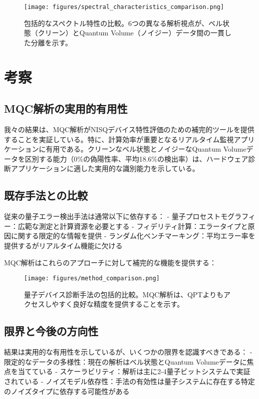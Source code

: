 \documentclass[a4paper,11pt]{article}
\begin{document}
\begin{CJK}{UTF8}{min}
\begin{figure}[H]
\centering
\texttt{[image: figures/spectral\_characteristics\_comparison.png]}
\caption{包括的なスペクトル特性の比較。6つの異なる解析視点が、ベル状態（クリーン）とQuantum Volume（ノイジー）データ間の一貫した分離を示す。}
\label{fig:spectral_comparison}
\end{figure}

\section{考察}

\subsection{MQC解析の実用的有用性}

我々の結果は、MQC解析がNISQデバイス特性評価のための補完的ツールを提供することを実証している。特に、計算効率が重要となるリアルタイム監視アプリケーションに有用である。クリーンなベル状態とノイジーなQuantum Volumeデータを区別する能力（0\%の偽陽性率、平均18.6\%の検出率）は、ハードウェア診断アプリケーションに適した実用的な識別能力を示している。

\subsection{既存手法との比較}

従来の量子エラー検出手法は通常以下に依存する：
- 量子プロセストモグラフィー：広範な測定と計算資源を必要とする
- フィデリティ計算：エラータイプと原因に関する限定的な情報を提供
- ランダム化ベンチマーキング：平均エラー率を提供するがリアルタイム機能に欠ける

MQC解析はこれらのアプローチに対して補完的な機能を提供する：

\begin{figure}[H]
\centering
\texttt{[image: figures/method\_comparison.png]}
\caption{量子デバイス診断手法の包括的比較。MQC解析は、QPTよりもアクセスしやすく良好な精度を提供することを示す。}
\label{fig:method_comparison}
\end{figure}

\subsection{限界と今後の方向性}

結果は実用的な有用性を示しているが、いくつかの限界を認識すべきである：
- 限定的なデータの多様性：現在の解析はベル状態とQuantum Volumeデータに焦点を当てている
- スケーラビリティ：解析は主に2-4量子ビットシステムで実証されている
- ノイズモデル依存性：手法の有効性は量子システムに存在する特定のノイズタイプに依存する可能性がある


\end{CJK}
\end{document}
